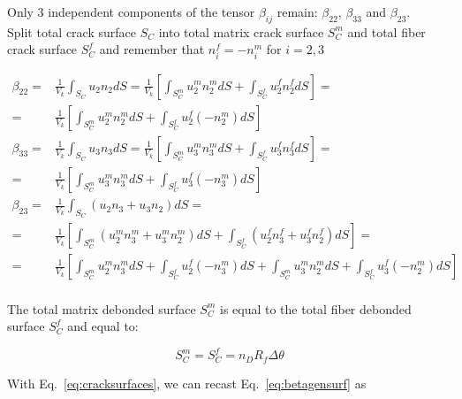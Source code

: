 \documentclass[review]{elsarticle}
\begin{document}
Only 3 independent components of the tensor $\beta_{ij}$ remain: $\beta_{22}$, $\beta_{33}$ and $\beta_{23}$.\\
Split total crack surface $S_{C}$ into total matrix crack surface $S_{C}^{m}$ and total fiber crack surface $S_{C}^{f}$ and remember that $n_{i}^{f}=-n_{i}^{m}$ for $i=2,3$

\begin{equation}\label{eq:betagensurf}
\begin{aligned}
\beta_{22}=&\frac{1}{V_{k}}\int_{S_{C}}u_{2}n_{2}dS=\frac{1}{V_{k}}\left[\int_{S_{C}^{m}}u_{2}^{m}n_{2}^{m}dS+\int_{S_{C}^{f}}u_{2}^{f}n_{2}^{f}dS\right]=\\
=&\frac{1}{V_{k}}\left[\int_{S_{C}^{m}}u_{2}^{m}n_{2}^{m}dS+\int_{S_{C}^{f}}u_{2}^{f}\left(-n_{2}^{m}\right)dS\right]\\
\beta_{33}=&\frac{1}{V_{k}}\int_{S_{C}}u_{3}n_{3}dS=\frac{1}{V_{k}}\left[\int_{S_{C}^{m}}u_{3}^{m}n_{3}^{m}dS+\int_{S_{C}^{f}}u_{3}^{f}n_{3}^{f}dS\right]=\\
=&\frac{1}{V_{k}}\left[\int_{S_{C}^{m}}u_{3}^{m}n_{3}^{m}dS+\int_{S_{C}^{f}}u_{3}^{f}\left(-n_{3}^{m}\right)dS\right]\\
\beta_{23}=&\frac{1}{V_{k}}\int_{S_{C}}\left(u_{2}n_{3}+u_{3}n_{2}\right)dS=\\
=&\frac{1}{V_{k}}\left[\int_{S_{C}^{m}}\left(u_{2}^{m}n_{3}^{m}+u_{3}^{m}n_{2}^{m}\right)dS+\int_{S_{C}^{f}}\left(u_{2}^{f}n_{3}^{f}+u_{3}^{f}n_{2}^{f}\right)dS\right]=\\
=&\frac{1}{V_{k}}\left[\int_{S_{C}^{m}}u_{2}^{m}n_{3}^{m}dS+\int_{S_{C}^{f}}u_{2}^{f}\left(-n_{3}^{m}\right)dS+\int_{S_{C}^{m}}u_{3}^{m}n_{2}^{m}dS+\int_{S_{C}^{f}}u_{3}^{f}\left(-n_{2}^{m}\right)dS\right]\\
\end{aligned}
\end{equation}

The total matrix debonded surface $S_{C}^{m}$ is equal to the total fiber debonded surface $S_{C}^{f}$ and equal to:

\begin{equation}\label{eq:cracksurfaces}
S_{C}^{m}=S_{C}^{f}=n_{D}R_{f}\Delta\theta
\end{equation}

With Eq.~\ref{eq:cracksurfaces}, we can recast Eq.~\ref{eq:betagensurf} as
\end{document}

